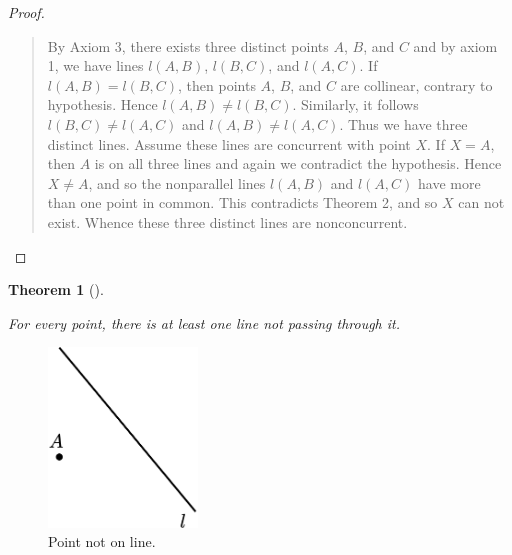 \documentclass[
  letterpaper,
  10pt,
  reqno,
  twopage,
  openany]{book}
\theoremstyle{plain}
\theoremstyle{definition}
\theoremstyle{definition}
\theoremstyle{definition}
\theoremstyle{plain}
\theoremstyle{plain}
\newtheorem{theorem}{Theorem}[chapter]
\theoremstyle{remark}
\begin{document}
\begin{proof}
\begin{quote}
By Axiom 3, there exists three distinct points \(A\), \(B\), and \(C\)
and by axiom 1, we have lines \(l(A,B)\), \(l(B,C)\), and \(l(A,C)\). If
\(l(A,B)=l(B,C)\), then points \(A\), \(B\), and \(C\) are collinear,
contrary to hypothesis. Hence \(l(A,B)\neq l(B,C)\). Similarly, it
follows \(l(B,C)\neq l(A,C)\) and \(l(A,B)\neq l(A,C)\). Thus we have
three distinct lines. Assume these lines are concurrent with point
\(X\). If \(X=A\), then \(A\) is on all three lines and again we
contradict the hypothesis. Hence \(X\neq A\), and so the nonparallel
lines \(l(A,B)\) and \(l(A,C)\) have more than one point in common. This
contradicts Theorem 2, and so \(X\) can not exist. Whence these three
distinct lines are nonconcurrent.
\end{quote}

\end{proof}

\leavevmode{}%
\begin{theorem}[]\label{thm-incidence4}

For every point, there is at least one line not passing through it.

\end{theorem}

\begin{figure}

{\centering \includegraphics[width=1.5625in,height=\textheight]{./images/incidence-geometry-3-pics.png}

}

\caption{\label{fig-onelinenot}Point not on line.}

\end{figure}
\end{document}
